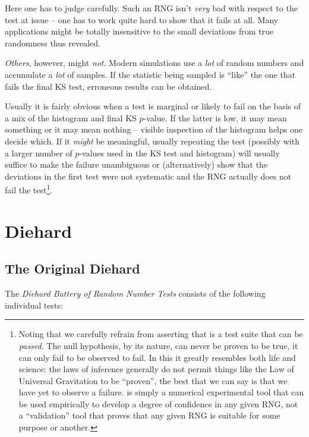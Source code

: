 \documentclass{book}
\begin{document}
Here one has to judge carefully.  Such an RNG isn't {\em very} bad with
respect to the test at issue -- one has to work quite hard to show that
it fails at all.  Many applications might be totally insensitive to the
small deviations from true randomness thus revealed.

{\em Others}, however, might {\em not}.  Modern simulations use a {\em
lot} of random numbers and accumulate a {\em lot} of samples.  If the
statistic being sampled is ``like'' the one that fails the final KS
test, erroneous results can be obtained.

Usually it is fairly obvious when a test is marginal or likely to fail
on the basis of a mix of the histogram and final KS $p$-value.  If the
latter is low, it may mean something or it may mean nothing -- visible
inspection of the histogram helps one decide which.  If it {\em might}
be meaningful, usually repeating the test (possibly with a larger number
of $p$-values used in the KS test and histogram) will usually suffice to
make the failure unambiguous or (alternatively) show that the deviations
in the first test were not systematic and the RNG actually does not fail
the test\footnote{Noting that we carefully refrain from asserting that
\die is a test suite that can be {\em passed}.  The null hypothesis, by
its nature, can never be proven to be true, it can only fail to be
observed to fail.  In this it greatly resembles both life and science:
the laws of inference generally do not permit things like the Law of
Universal Gravitation to be ``proven'', the best that we can say is that
we have yet to observe a failure.  \die is simply a numerical
experimental tool that can be used empirically to develop a degree of
confidence in any given RNG, not a ``validation'' tool that proves that
any given RNG is suitable for some purpose or another.}.

\chapter{Diehard}

\section{The Original Diehard}

The {\em Diehard Battery of Random Number Tests} consists of the
following individual tests:
\end{document}
